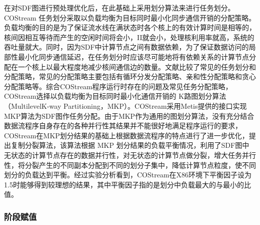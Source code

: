 在对SDF图进行预处理优化后，在此基础上采用划分算法来进行任务划分。COStream 任务划分采取以负载均衡为目标同时最小化同步通信开销的分配策略。负载均衡的目的是为了保证流水线在满状态时各个核上的有效计算时间是相等的，核间因相互等待而产生的空闲时间将会小，II就会小，处理核利用率就高，系统的吞吐量就大。同时，因为SDF中计算节点之间有数据依赖，为了保证数据访问的局部性最小化同步通信延迟，在任务划分时应该尽可能地将有依赖关系的计算节点分配在一个核上以最大程度地减少核间通信边的数量。文献比较了常见的任务划分和分配策略，常见的分配策略主要包括有循环分发分配策略、亲和性分配策略和贪心分配策略等。综合COStream程序运行时存在的问题及常见任务分配策略，COStream选择以负载均衡为目标同时最小化通信开销的 K路图划分算法（MultilevelK-way Partitioning，MKP）。COStream采用Metis提供的接口实现MKP算法为SDF图作任务分配。由于MKP作为通用的图划分算法，没有充分结合数据流程序自身存在的各种并行性其结果并不能很好地满足程序运行的要求，COStream在MKP划分结果的基础上根据数据流程序的特点进行了进一步优化，提出复制分裂算法，该算法根据 MKP 划分结果的负载平衡情况，利用了SDF图中无状态的计算节点存在的数据并行性，对无状态的计算节点做分裂，增大任务并行性，将分裂产生的不同副本分配到不同的划分子集中，降低计算节点粒度，使不同划分的负载达到平衡。经过实验分析看到，COStream在X86环境下平衡因子设为1.5时能够得到较理想的结果，其中平衡因子指的是划分中负载最大的与最小的比值。

\subsubsection{阶段赋值}

